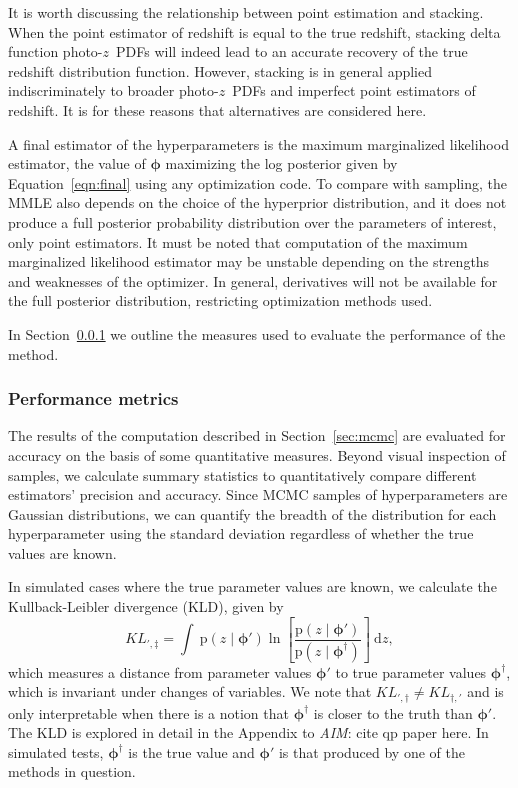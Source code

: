 \documentclass[iop]{emulateapj}
\newcommand{\todo}[3]{{\color{#2}\emph{#1}: #3}}
\newcommand{\aim}[1]{\todo{AIM}{red}{#1}}
\newcommand{\Sect}[1]{Section~\ref{#1}}
\newcommand{\Eq}[1]{Equation~\ref{#1}}
\newcommand{\pr}[1]{\ensuremath{\mathrm{p}(#1)}}
\newcommand{\gvn}{\mid}%
\newcommand{\integral}[2]{\ensuremath{\int\ #1\ \mathrm{d} #2}}
\newcommand{\pz}{photo-$z$~}
\newcommand{\pzpdf}{\pz PDF}
\newcommand{\bvec}[1]{{\ensuremath{\boldsymbol{#1}}}}
\newcommand{\ndphi}{\bvec{\phi}}
\begin{document}
It is worth discussing the relationship between point estimation and stacking.  
When the point estimator of redshift is equal to the true redshift, stacking 
delta function \pzpdf s will indeed lead to an accurate recovery of the true 
redshift distribution function.  
However, stacking is in general applied indiscriminately to broader \pzpdf s 
and imperfect point estimators of redshift.  
It is for these reasons that alternatives are considered here.

A final estimator of the hyperparameters is the maximum marginalized likelihood 
estimator, the value of $\ndphi$ maximizing the log posterior given by 
\Eq{eqn:final} using any optimization code.  
To compare with sampling, the MMLE also depends on the choice of the hyperprior 
distribution, and it does not produce a full posterior probability distribution 
over the parameters of interest, only point estimators.  
It must be noted that computation of the maximum marginalized likelihood 
estimator may be unstable depending on the strengths and weaknesses of the 
optimizer.  
In general, derivatives will not be available for the full posterior 
distribution, restricting optimization methods used.

In \Sect{sec:diag} we outline the measures used to evaluate the performance of 
the method.

\subsubsection{Performance metrics}
\label{sec:diag}

The results of the computation described in \Sect{sec:mcmc} are evaluated for 
accuracy on the basis of some quantitative measures.  
Beyond visual inspection of samples, we calculate summary statistics to 
quantitatively compare different estimators' precision and accuracy.  
Since MCMC samples of hyperparameters are Gaussian distributions, we can 
quantify the breadth of the distribution for each hyperparameter using the 
standard deviation regardless of whether the true values are known.  

In simulated cases where the true parameter values are known, we calculate the 
Kullback-Leibler divergence (KLD), given by 
\begin{equation}
\label{eqn:kl}
KL_{',\ddagger} = \integral{\pr{z \gvn \ndphi'} \ln \left[ \frac{\pr{z \gvn 
\ndphi'}}{\pr{z \gvn \ndphi^{\dagger}}} \right]}{z} ,
\end{equation}
which measures a distance from parameter values $\ndphi'$ to true parameter 
values $\ndphi^{\dagger}$, which is invariant under changes of variables.  
We note that $KL_{',\dagger} \neq KL_{\dagger,'}$ and is only interpretable 
when there is a notion that $\ndphi^{\dagger}$ is closer to the truth than 
$\ndphi'$.
The KLD is explored in detail in the Appendix to \aim{cite qp paper here}.
In simulated tests, $\ndphi^{\dagger}$ is the true value and $\ndphi'$ is that 
produced by one of the methods in question.
\end{document}
